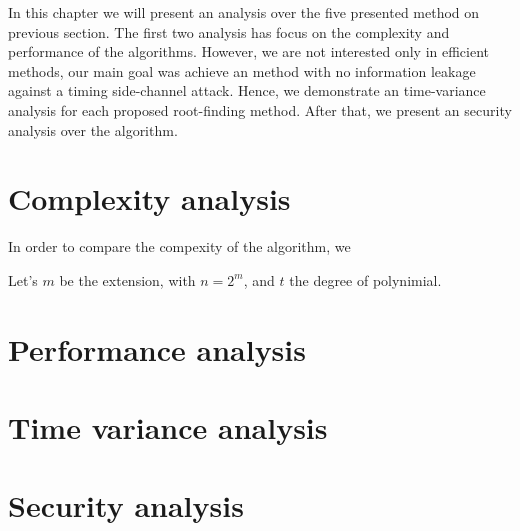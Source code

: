 In this chapter we will present an analysis over the five presented method on previous section. The first two analysis has focus on the complexity and performance of the algorithms. However, we are not interested only in efficient methods, our main goal was achieve an method with no information leakage against a timing side-channel attack. Hence, we demonstrate an time-variance analysis for each proposed root-finding method. After that, we present an security analysis over the algorithm.

\section{Complexity analysis}
In order to compare the compexity of the algorithm, we 

Let's $m$ be the extension, with $n = 2^m$, and $t$ the degree of polynimial.
\section{Performance analysis}
\section{Time variance analysis}
\section{Security analysis}